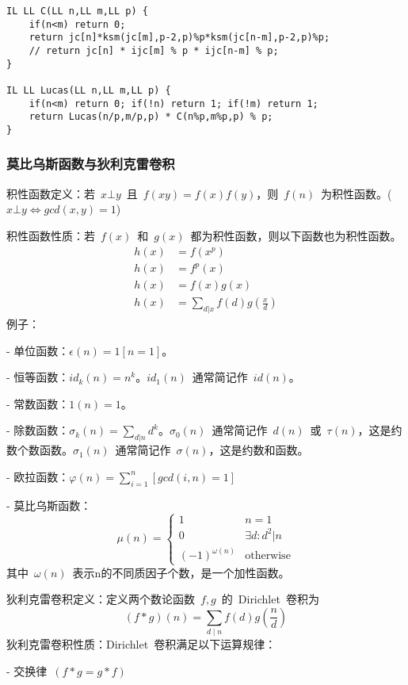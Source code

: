 \documentclass[UTF8]{ctexart}
\begin{document}
\begin{framed}
\begin{lstlisting}
IL LL C(LL n,LL m,LL p) {
    if(n<m) return 0;
    return jc[n]*ksm(jc[m],p-2,p)%p*ksm(jc[n-m],p-2,p)%p;
    // return jc[n] * ijc[m] % p * ijc[n-m] % p;
}

IL LL Lucas(LL n,LL m,LL p) {
    if(n<m) return 0; if(!n) return 1; if(!m) return 1;
    return Lucas(n/p,m/p,p) * C(n%p,m%p,p) % p;
}
\end{lstlisting}
\end{framed}

\subsubsection{莫比乌斯函数与狄利克雷卷积}

积性函数定义：若\ $x \bot y$\ 且\ $f(xy)=f(x)f(y)$，则\ $f(n)$\ 为积性函数。($x \bot y \iff gcd(x,y)=1$)

积性函数性质：若\ $f(x)$\ 和\ $g(x)$\ 都为积性函数，则以下函数也为积性函数。
\begin{align*}
h(x)&=f(x^p) \\
h(x)&=f^p(x) \\
h(x)&=f(x)g(x) \\
h(x)&=\sum_{d|x}f(d)g(\frac{x}{d})
\end{align*}
例子：

- 单位函数：$\epsilon(n)=1[n=1]$。

- 恒等函数：$id_k(n)=n^k$。$id_1(n)$\ 通常简记作\ $id(n)$。

- 常数函数：$1(n)=1$。

- 除数函数：$\sigma_k(n)=\sum_{d|n}d^k$。$\sigma_0(n)$\ 通常简记作\ $d(n)$\ 或\ $\tau(n)$，这是约数个数函数。$\sigma_1(n)$\ 通常简记作\ $\sigma(n)$，这是约数和函数。

- 欧拉函数：$\varphi(n)=\sum_{i=1}^n[gcd(i,n)=1]$

- 莫比乌斯函数：
  $$\mu(n)=
  \begin{cases}
  1& \text{$n=1$}\\
  0& \text{$\exists d:d^2|n$}\\
  (-1)^{\omega(n)}& \text{otherwise}
  \end{cases}$$
  其中\ $\omega(n)$\ 表示n的不同质因子个数，是一个加性函数。

狄利克雷卷积定义：定义两个数论函数\ $f,g$\ 的\ Dirichlet\ 卷积为
$$ (f\ast g)(n)=\sum_{d\mid n}f(d)g(\frac{n}{d}) $$
狄利克雷卷积性质：Dirichlet\ 卷积满足以下运算规律：

- 交换律\ $(f * g=g * f)$ 
\end{document}
